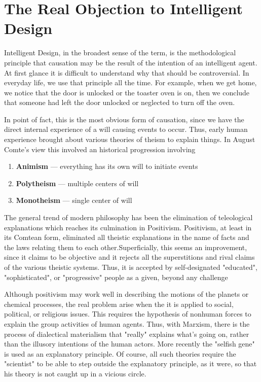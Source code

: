 \section{The Real Objection to Intelligent Design}

Intelligent Design, in the broadest sense of the term, is the methodological principle that causation may be the result of the intention of an intelligent agent. At first glance it is difficult to understand why that should be controversial. In everyday life, we use that principle all the time. For example, when we get home, we notice that the door is unlocked or the toaster oven is on, then we conclude that someone had left the door unlocked or neglected to turn off the oven.

In point of fact, this is the most obvious form of causation, since we have the direct internal experience of a will causing events to occur. Thus, early human experience brought about various theories of theism to explain things. In August Comte's view this involved an historical progression involving

\begin{enumerate}


\item \textbf{Animism} --- everything has its own will to initiate events


\item \textbf{Polytheism} --- multiple centers of will


\item \textbf{Monotheism} --- single center of will

\end{enumerate}


The general trend of modern philosophy has been the elimination of teleological explanations which reaches its culmination in Positivism. Positivism, at least in its Comtean form, eliminated all theistic explanations in the name of facts and the laws relating them to each other.Superficially, this seems an improvement, since it claims to be objective and it rejects all the superstitions and rival claims of the various theistic systems. Thus, it is accepted by self-designated "educated", "sophisticated", or "progressive" people as a given, beyond any challenge

Although positivism may work well in describing the motions of the planets or chemical processes, the real problem arise when the it is applied to social, political, or religious issues. This requires the hypothesis of nonhuman forces to explain the group activities of human agents. Thus, with Marxism, there is the process of dialectical materialism that "really" explains what's going on, rather than the illusory intentions of the human actors. More recently the "selfish gene" is used as an explanatory principle. Of course, all such theories require the "scientist" to be able to step outside the explanatory principle, as it were, so that his theory is not caught up in a vicious circle.

